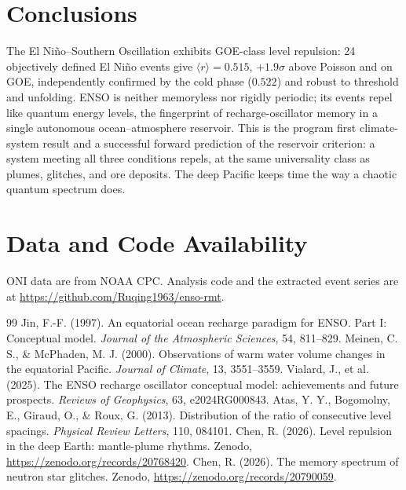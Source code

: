 \documentclass[12pt,a4paper]{article}
\begin{document}
\section{Conclusions}
The El Ni\~no--Southern Oscillation exhibits GOE-class level repulsion: 24 objectively defined El Ni\~no events give $\langle r\rangle=0.515$, $+1.9\sigma$ above Poisson and on GOE, independently confirmed by the cold phase ($0.522$) and robust to threshold and unfolding. ENSO is neither memoryless nor rigidly periodic; its events repel like quantum energy levels, the fingerprint of recharge-oscillator memory in a single autonomous ocean--atmosphere reservoir. This is the program first climate-system result and a successful forward prediction of the reservoir criterion: a system meeting all three conditions repels, at the same universality class as plumes, glitches, and ore deposits. The deep Pacific keeps time the way a chaotic quantum spectrum does.

\section*{Data and Code Availability}
ONI data are from NOAA CPC. Analysis code and the extracted event series are at \url{https://github.com/Ruqing1963/enso-rmt}.

\begin{thebibliography}{99}
\small
{} Jin, F.-F. (1997). An equatorial ocean recharge paradigm for ENSO. Part I: Conceptual model. \emph{Journal of the Atmospheric Sciences}, 54, 811--829.
 Meinen, C. S., \& McPhaden, M. J. (2000). Observations of warm water volume changes in the equatorial Pacific. \emph{Journal of Climate}, 13, 3551--3559.
 Vialard, J., et al. (2025). The ENSO recharge oscillator conceptual model: achievements and future prospects. \emph{Reviews of Geophysics}, 63, e2024RG000843.
 Atas, Y. Y., Bogomolny, E., Giraud, O., \& Roux, G. (2013). Distribution of the ratio of consecutive level spacings. \emph{Physical Review Letters}, 110, 084101.
 Chen, R. (2026). Level repulsion in the deep Earth: mantle-plume rhythms. Zenodo, \url{https://zenodo.org/records/20768420}.
 Chen, R. (2026). The memory spectrum of neutron star glitches. Zenodo, \url{https://zenodo.org/records/20790059}.
\end{thebibliography}
\end{document}
